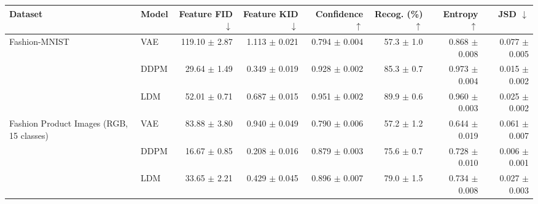 \begin{tabular}{llrrrrrr}
\toprule
Dataset & Model & Feature FID $\downarrow$ & Feature KID $\downarrow$ & Confidence $\uparrow$ & Recog. (\%) $\uparrow$ & Entropy $\uparrow$ & JSD $\downarrow$ \\
\midrule
Fashion-MNIST & VAE & 119.10 $\pm$ 2.87 & 1.113 $\pm$ 0.021 & 0.794 $\pm$ 0.004 & 57.3 $\pm$ 1.0 & 0.868 $\pm$ 0.008 & 0.077 $\pm$ 0.005 \\
 & DDPM & 29.64 $\pm$ 1.49 & 0.349 $\pm$ 0.019 & 0.928 $\pm$ 0.002 & 85.3 $\pm$ 0.7 & 0.973 $\pm$ 0.004 & 0.015 $\pm$ 0.002 \\
 & LDM & 52.01 $\pm$ 0.71 & 0.687 $\pm$ 0.015 & 0.951 $\pm$ 0.002 & 89.9 $\pm$ 0.6 & 0.960 $\pm$ 0.003 & 0.025 $\pm$ 0.002 \\
\midrule
Fashion Product Images (RGB, 15 classes) & VAE & 83.88 $\pm$ 3.80 & 0.940 $\pm$ 0.049 & 0.790 $\pm$ 0.006 & 57.2 $\pm$ 1.2 & 0.644 $\pm$ 0.019 & 0.061 $\pm$ 0.007 \\
 & DDPM & 16.67 $\pm$ 0.85 & 0.208 $\pm$ 0.016 & 0.879 $\pm$ 0.003 & 75.6 $\pm$ 0.7 & 0.728 $\pm$ 0.010 & 0.006 $\pm$ 0.001 \\
 & LDM & 33.65 $\pm$ 2.21 & 0.429 $\pm$ 0.045 & 0.896 $\pm$ 0.007 & 79.0 $\pm$ 1.5 & 0.734 $\pm$ 0.008 & 0.027 $\pm$ 0.003 \\
\bottomrule
\end{tabular}